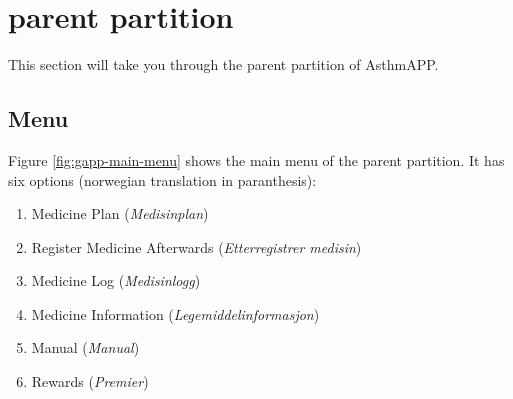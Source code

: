 % 	
% 	





\section{parent partition}
This section will take you through the parent partition of AsthmAPP.

\subsection{Menu}
\label{sec:description-menu}
Figure \ref{fig:gapp-main-menu} shows the main menu of the parent partition. It has six options (norwegian translation in paranthesis):
\begin{enumerate}
  \item Medicine Plan (\emph{Medisinplan})
  \item Register Medicine Afterwards (\emph{Etterregistrer medisin})
  \item Medicine Log (\emph{Medisinlogg})
  \item Medicine Information (\emph{Legemiddelinformasjon})
  \item Manual (\emph{Manual})
  \item Rewards (\emph{Premier})
\end{enumerate} 


